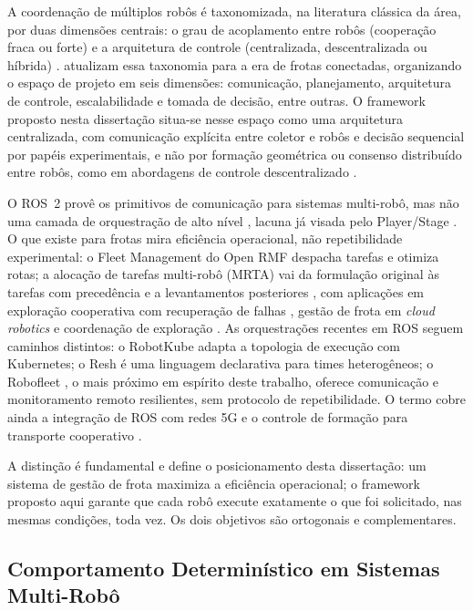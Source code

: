 A coordenação de múltiplos robôs é taxonomizada, na literatura clássica da área,
por duas dimensões centrais: o grau de acoplamento entre robôs (cooperação fraca
ou forte) e a arquitetura de controle (centralizada, descentralizada ou híbrida)
\cite{farinelli2004}.  atualizam essa taxonomia para a era
de frotas conectadas, organizando o espaço de projeto em seis dimensões:
comunicação, planejamento, arquitetura de controle, escalabilidade e tomada de
decisão, entre outras. O framework proposto nesta dissertação situa-se nesse
espaço como uma arquitetura centralizada, com comunicação explícita entre coletor
e robôs e decisão sequencial por papéis experimentais, e não por formação
geométrica ou consenso distribuído entre robôs, como em abordagens de controle
descentralizado \cite{cortes2017}.

O ROS~2 provê os primitivos de comunicação para sistemas multi-robô, mas não uma
camada de orquestração de alto nível \cite{macenski2022ros2}, lacuna já visada pelo
Player/Stage \cite{gerkey2003playerstage}. O que existe para frotas mira eficiência
operacional, não repetibilidade experimental: o Fleet Management do Open RMF
despacha tarefas e otimiza rotas; a alocação de tarefas multi-robô (MRTA) vai da
formulação original \cite{gerkey2004} às tarefas com precedência \cite{korsah2013}
e a levantamentos posteriores \cite{khamis2015}, com aplicações em exploração
cooperativa com recuperação de falhas \cite{yan2023}, gestão de frota em
\textit{cloud robotics} \cite{singhal2017} e coordenação de exploração
\cite{burgard2000exploration, fox2006multirobot}. As orquestrações recentes em ROS
seguem caminhos distintos: o RobotKube \cite{lampe2023} adapta a topologia de
execução com Kubernetes; o Resh \cite{carroll2021} é uma linguagem declarativa para
times heterogêneos; o Robofleet \cite{sikand2021}, o mais próximo em espírito deste
trabalho, oferece comunicação e monitoramento remoto resilientes, sem protocolo de
repetibilidade. O termo cobre ainda a integração de ROS com redes 5G
\cite{romero2023} e o controle de formação para transporte cooperativo
\cite{alonsomora2017}.

A distinção é fundamental e define o posicionamento desta dissertação: um sistema
de gestão de frota maximiza a eficiência operacional; o framework proposto aqui
garante que cada robô execute exatamente o que foi solicitado, nas mesmas condições,
toda vez. Os dois objetivos são ortogonais e complementares.

\subsection{Comportamento Determinístico em Sistemas Multi-Robô}

